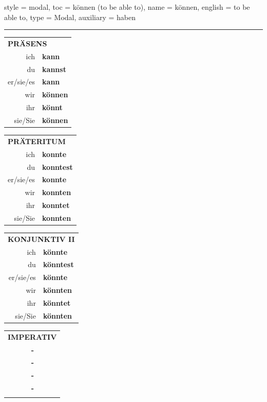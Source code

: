 \begin{verbentry}{
  style = {modal},
  toc = {können (to be able to)},
  name = {können},
  english = {to be able to},
  type = {Modal},
  auxiliary = {haben}
}
 
     \vspace{5pt}
    \hrule
    \vspace{5pt}
  \begin{tabular}{rl}
     \multicolumn{2}{l}{\textbf{PRÄSENS} }\\
    ich & \textbf{kann}\\
    du & \textbf{kannst}\\
    er/sie/es & \textbf{kann}\\
    wir & \textbf{können}\\
    ihr & \textbf{könnt}\\
    sie/Sie & \textbf{können}\\
  \end{tabular}
  \hfill
     \begin{tabular}{rl}
    \multicolumn{2}{l}{\textbf{PRÄTERITUM} }\\
    ich & \textbf{konnte}\\
    du & \textbf{konntest}\\
    er/sie/es & \textbf{konnte}\\
    wir & \textbf{konnten}\\
    ihr & \textbf{konntet}\\
    sie/Sie & \textbf{konnten}\\
  \end{tabular}
   \hfill
     \begin{tabular}{rl}
    \multicolumn{2}{l}{\textbf{KONJUNKTIV II} }\\
    ich & \textbf{könnte}\\
    du & \textbf{könntest}\\
    er/sie/es & \textbf{könnte}\\
    wir & \textbf{könnten}\\
    ihr & \textbf{könntet}\\
    sie/Sie & \textbf{könnten}\\
  \end{tabular}
  \hfill
  \begin{tabular}{rl}
     \multicolumn{2}{l}{\textbf{IMPERATIV} }\\
   & \textbf{-}\\
   & \textbf{-}\\
   & \textbf{-}\\
   & \textbf{-}\\
   & \vspace{10pt}
  \end{tabular}


\end{verbentry}

